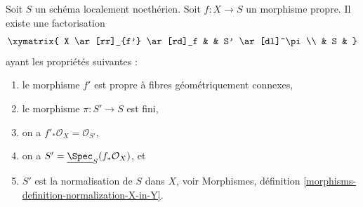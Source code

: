 \begin{theorem}
\label{theorem-stein-factorization-Noetherian}
Soit $S$ un schéma localement noethérien.
Soit $f : X \to S$ un morphisme propre.
Il existe une factorisation
$$
\xymatrix{
X \ar[rr]_{f'} \ar[rd]_f & & S' \ar[dl]^\pi \\
& S &
}
$$
ayant les propriétés suivantes :
\begin{enumerate}
\item le morphisme $f'$ est propre à fibres géométriquement connexes,
\item le morphisme $\pi : S' \to S$ est fini,
\item on a $f'_*\mathcal{O}_X = \mathcal{O}_{S'}$,
\item on a $S' = \underline{\Spec}_S(f_*\mathcal{O}_X)$, et
\item $S'$ est la normalisation de $S$ dans $X$, voir
Morphismes, définition \ref{morphisms-definition-normalization-X-in-Y}.
\end{enumerate}
\end{theorem}


